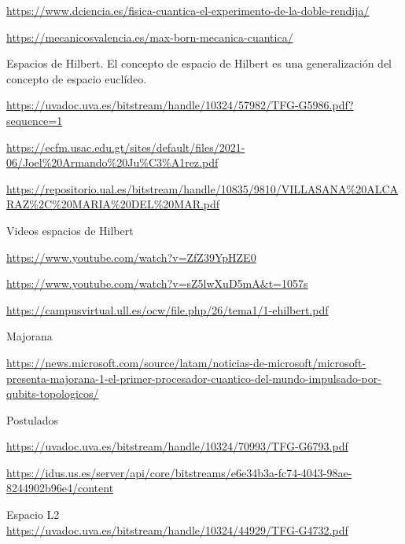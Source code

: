 \documentclass{article}
\numberwithin{equation}{section} %
\begin{document}
        \url{https://www.dciencia.es/fisica-cuantica-el-experimento-de-la-doble-rendija/}
        \vspace{2mm}

        \url{https://mecanicosvalencia.es/max-born-mecanica-cuantica/}
        \vspace{2mm}

        Espacios de Hilbert. El concepto de espacio de Hilbert es una generalización del concepto de espacio euclídeo.\par
        \url{https://uvadoc.uva.es/bitstream/handle/10324/57982/TFG-G5986.pdf?sequence=1}
        \vspace{2mm}

        \url{https://ecfm.usac.edu.gt/sites/default/files/2021-06/Joel%20Armando%20Ju%C3%A1rez.pdf}
        \vspace{2mm}

        \url{https://repositorio.ual.es/bitstream/handle/10835/9810/VILLASANA%20ALCARAZ%2C%20MARIA%20DEL%20MAR.pdf}
        \vspace{2mm}

        Videos espacios de Hilbert\par
        \url{https://www.youtube.com/watch?v=ZfZ39YpHZE0}
        \vspace{2mm}

        \url{https://www.youtube.com/watch?v=sZ5lwXuD5mA&t=1057s}
        \vspace{2mm}

        \url{https://campusvirtual.ull.es/ocw/file.php/26/tema1/1-ehilbert.pdf}
        \vspace{2mm}

        Majorana\par
        \url{https://news.microsoft.com/source/latam/noticias-de-microsoft/microsoft-presenta-majorana-1-el-primer-procesador-cuantico-del-mundo-impulsado-por-qubits-topologicos/}
        \vspace{2mm}

        Postulados\par
        \url{https://uvadoc.uva.es/bitstream/handle/10324/70993/TFG-G6793.pdf}
        \vspace{2mm}

        \url{https://idus.us.es/server/api/core/bitstreams/e6e34b3a-fc74-4043-98ae-8244902b96e4/content}
        \vspace{2mm}

        Espacio L2 \\
        \url{https://uvadoc.uva.es/bitstream/handle/10324/44929/TFG-G4732.pdf}

    
\end{document}
